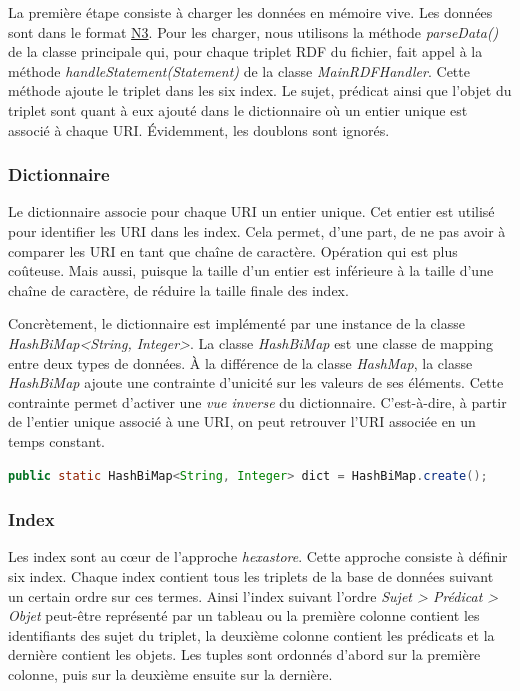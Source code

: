 \documentclass[12pt,titlepage]{article}
\begin{document}
La première étape consiste à charger les données en mémoire vive. Les données sont dans le format \href{https://fr.wikipedia.org/wiki/Notation3}{N3}. Pour les charger, nous utilisons la méthode \textit{parseData()} de la classe principale qui, pour chaque triplet RDF du fichier, fait appel à la méthode \textit{handleStatement(Statement)} de la classe \textit{MainRDFHandler}. Cette méthode ajoute le triplet dans les six index. Le sujet, prédicat ainsi que l'objet du triplet sont quant à eux ajouté dans le dictionnaire où un entier unique est associé à chaque URI. Évidemment, les doublons sont ignorés.

\subsubsection{Dictionnaire}

Le dictionnaire associe pour chaque URI un entier unique. Cet entier est utilisé pour identifier les URI dans les index. Cela permet, d'une part, de ne pas avoir à comparer les URI en tant que chaîne de caractère. Opération qui est plus coûteuse. Mais aussi, puisque la taille d'un entier est inférieure à la taille d'une chaîne de caractère, de réduire la taille finale des index.

Concrètement, le dictionnaire est implémenté par une instance de la classe \textit{HashBiMap<String, Integer>}. La classe \textit{HashBiMap} est une classe de mapping entre deux types de données. À la différence de la classe \textit{HashMap}, la classe \textit{HashBiMap} ajoute une contrainte d'unicité sur les valeurs de ses éléments. Cette contrainte permet d'activer une \textit{vue inverse} du dictionnaire. C'est-à-dire, à partir de l'entier unique associé à une URI, on peut retrouver l'URI associée en un temps constant.

\begin{lstlisting}[language=Java]
	public static HashBiMap<String, Integer> dict = HashBiMap.create();
\end{lstlisting}

\subsubsection{Index}

Les index sont au cœur de l'approche \textit{hexastore}. Cette approche consiste à définir six index. Chaque index contient tous les triplets de la base de données suivant un certain ordre sur ces termes. Ainsi l'index suivant l'ordre \textit{Sujet > Prédicat > Objet} peut-être représenté par un tableau ou la première colonne contient les identifiants des sujet du triplet, la deuxième colonne contient les prédicats et la dernière contient les objets. Les tuples sont ordonnés d'abord sur la première colonne, puis sur la deuxième ensuite sur la dernière.
\end{document}
